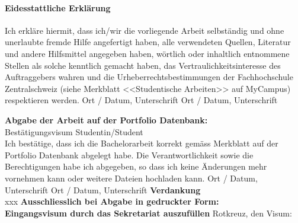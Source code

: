 	
	
	
	\paragraph{\textbf{Eidesstattliche Erkl\"arung}}
	Ich erkl\"are hiermit, dass ich/wir die vorliegende Arbeit selbst\"andig und ohne unerlaubte fremde Hilfe angefertigt haben, alle verwendeten Quellen, Literatur und andere Hilfsmittel angegeben haben, w\"ortlich oder inhaltlich entnommene Stellen als solche kenntlich gemacht haben, das Vertraulichkeitsinteresse des Auftraggebers wahren und die Urheberrechtsbestimmungen der Fachhochschule Zentralschweiz (siehe Merkblatt <<Studentische Arbeiten>> auf MyCampus) respektieren werden. \newline \newline 
	Ort / Datum, Unterschrift	\underline{\hspace*{4cm}} \newline \newline
	Ort / Datum, Unterschrift	\underline{\hspace*{4cm}} 
	
	
	\newpage
	\noindent
	\textbf{Abgabe der Arbeit auf der Portfolio Datenbank:}\\
	Best\"atigungsvisum Studentin/Student\\
	Ich best\"atige, dass ich die Bachelorarbeit korrekt gem\"ass Merkblatt auf der Portfolio Datenbank abgelegt habe. Die Verantwortlichkeit sowie die Berechtigungen habe ich abgegeben, so dass ich keine \"Anderungen mehr vornehmen kann oder weitere Dateien hochladen kann. \newline \newline 
	Ort / Datum, Unterschrift	\underline{\hspace*{4cm}} \newline \newline
	{\color{red}Ort / Datum, Unterschrift	\underline{\hspace*{4cm}}} \newline \newline \newline
	\textbf{Verdankung}\\
	{\color{red}xxx} \newline \newline \newline
	\noindent
	{\textbf{Ausschliesslich bei Abgabe in gedruckter Form: \\
			Eingangsvisum durch das Sekretariat auszuf\"ullen}} \newline \newline
	Rotkreuz, den	\underline{\hspace*{4cm}} \hspace*{1cm}	Visum:	\underline{\hspace*{4cm}} \vspace*{10cm}
	
